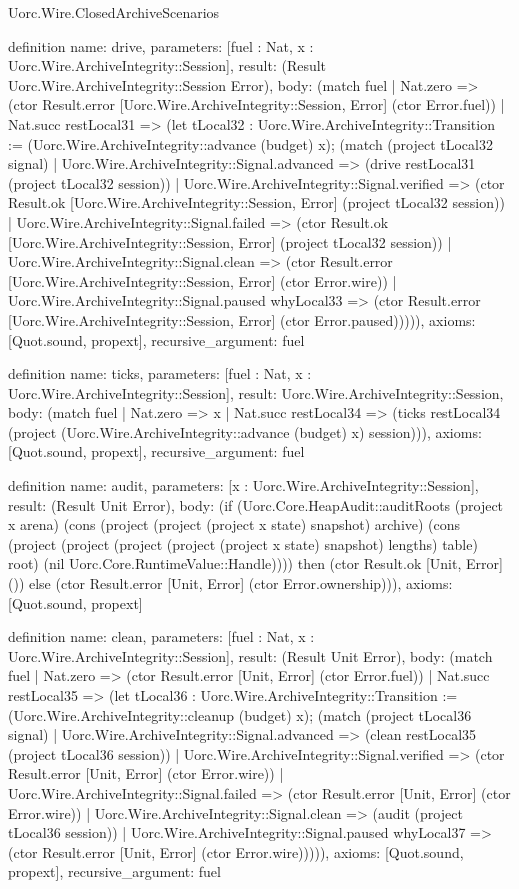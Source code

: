 \begin{lexlean}{Uorc.Wire.ClosedArchiveScenarios}
\begin{semanticmodule}
definition{
  name: drive,
  parameters: [fuel : Nat, x : Uorc.Wire.ArchiveIntegrity::Session],
  result: (Result Uorc.Wire.ArchiveIntegrity::Session Error),
  body: (match fuel
    | Nat.zero => (ctor Result.error [Uorc.Wire.ArchiveIntegrity::Session, Error] (ctor Error.fuel))
    | Nat.succ restLocal31 => (let tLocal32 : Uorc.Wire.ArchiveIntegrity::Transition := (Uorc.Wire.ArchiveIntegrity::advance (budget) x); (match (project tLocal32 signal)
      | Uorc.Wire.ArchiveIntegrity::Signal.advanced => (drive restLocal31 (project tLocal32 session))
      | Uorc.Wire.ArchiveIntegrity::Signal.verified => (ctor Result.ok [Uorc.Wire.ArchiveIntegrity::Session, Error] (project tLocal32 session))
      | Uorc.Wire.ArchiveIntegrity::Signal.failed => (ctor Result.ok [Uorc.Wire.ArchiveIntegrity::Session, Error] (project tLocal32 session))
      | Uorc.Wire.ArchiveIntegrity::Signal.clean => (ctor Result.error [Uorc.Wire.ArchiveIntegrity::Session, Error] (ctor Error.wire))
      | Uorc.Wire.ArchiveIntegrity::Signal.paused whyLocal33 => (ctor Result.error [Uorc.Wire.ArchiveIntegrity::Session, Error] (ctor Error.paused))))),
  axioms: [Quot.sound, propext],
  recursive_argument: fuel
}

definition{
  name: ticks,
  parameters: [fuel : Nat, x : Uorc.Wire.ArchiveIntegrity::Session],
  result: Uorc.Wire.ArchiveIntegrity::Session,
  body: (match fuel
    | Nat.zero => x
    | Nat.succ restLocal34 => (ticks restLocal34 (project (Uorc.Wire.ArchiveIntegrity::advance (budget) x) session))),
  axioms: [Quot.sound, propext],
  recursive_argument: fuel
}

definition{
  name: audit,
  parameters: [x : Uorc.Wire.ArchiveIntegrity::Session],
  result: (Result Unit Error),
  body: (if (Uorc.Core.HeapAudit::auditRoots (project x arena) (cons (project (project (project x state) snapshot) archive) (cons (project (project (project (project (project x state) snapshot) lengths) table) root) (nil Uorc.Core.RuntimeValue::Handle)))) then (ctor Result.ok [Unit, Error] ()) else (ctor Result.error [Unit, Error] (ctor Error.ownership))),
  axioms: [Quot.sound, propext]
}

definition{
  name: clean,
  parameters: [fuel : Nat, x : Uorc.Wire.ArchiveIntegrity::Session],
  result: (Result Unit Error),
  body: (match fuel
    | Nat.zero => (ctor Result.error [Unit, Error] (ctor Error.fuel))
    | Nat.succ restLocal35 => (let tLocal36 : Uorc.Wire.ArchiveIntegrity::Transition := (Uorc.Wire.ArchiveIntegrity::cleanup (budget) x); (match (project tLocal36 signal)
      | Uorc.Wire.ArchiveIntegrity::Signal.advanced => (clean restLocal35 (project tLocal36 session))
      | Uorc.Wire.ArchiveIntegrity::Signal.verified => (ctor Result.error [Unit, Error] (ctor Error.wire))
      | Uorc.Wire.ArchiveIntegrity::Signal.failed => (ctor Result.error [Unit, Error] (ctor Error.wire))
      | Uorc.Wire.ArchiveIntegrity::Signal.clean => (audit (project tLocal36 session))
      | Uorc.Wire.ArchiveIntegrity::Signal.paused whyLocal37 => (ctor Result.error [Unit, Error] (ctor Error.wire))))),
  axioms: [Quot.sound, propext],
  recursive_argument: fuel
}


\end{semanticmodule}
\end{lexlean}
